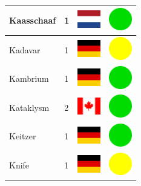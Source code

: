 \documentclass[12pt, a4paper, twoside]{report}
\begin{document}
\begin{center}
\begin{longtable}{|p{5cm}|p{2cm}|p{2cm}|p{2cm}|}
			Kaasschaaf & 1 & \includegraphics[width=1cm]{4x3/nl} & \includegraphics[width=1cm]{likes/y} \\ \hline
			Kadavar & 1 & \includegraphics[width=1cm]{4x3/de} & \includegraphics[width=1cm]{likes/m} \\ \hline
			Kambrium & 1 & \includegraphics[width=1cm]{4x3/de} & \includegraphics[width=1cm]{likes/y} \\ \hline
			Kataklysm & 2 & \includegraphics[width=1cm]{4x3/ca} & \includegraphics[width=1cm]{likes/y} \\ \hline
			Keitzer & 1 & \includegraphics[width=1cm]{4x3/de} & \includegraphics[width=1cm]{likes/y} \\ \hline
			Knife & 1 & \includegraphics[width=1cm]{4x3/de} & \includegraphics[width=1cm]{likes/m} \\ \hline

\end{longtable}
\end{center}
\end{document}
